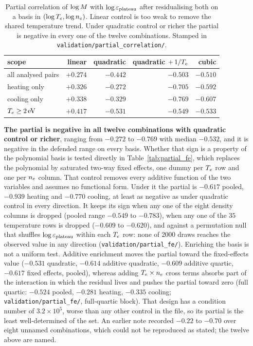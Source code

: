 \begin{table}[htbp]
\centering
\caption{Partial correlation of $\log M$ with $\log\varepsilon_{\mathrm{plateau}}$ after
residualising both on a basis in $(\log T_e,\log n_e)$. Linear control is too
weak to remove the shared temperature trend. Under quadratic control or richer
the partial is negative in every one of the twelve combinations.
Stamped in \texttt{validation/partial\_correlation/}.}
\label{tab:partial_sweep}
\begin{tabular}{lrrrr}
  \toprule
  scope & linear & quadratic & quadratic $+\,1/T_e$ & cubic \\
  \midrule
  all analysed pairs & $+0.274$ & $-0.442$ & $-0.503$ & $-0.510$ \\
  heating only       & $+0.326$ & $-0.272$ & $-0.705$ & $-0.592$ \\
  cooling only       & $+0.338$ & $-0.329$ & $-0.769$ & $-0.607$ \\
  $T_e\ge\SI{2}{\electronvolt}$ & $+0.417$ & $-0.531$ & $-0.549$ & $-0.533$ \\
  \bottomrule
\end{tabular}
\end{table}

\textbf{The partial is negative in all twelve combinations with quadratic
control or richer}, ranging from $-0.272$ to $-0.769$ with median $-0.532$, and
it is negative in the defended range on every basis. Whether that sign is a
property of the polynomial basis is tested directly in
Table~\ref{tab:partial_fe}, which replaces the polynomial by saturated two-way
fixed effects, one dummy per $T_e$ row and one per $n_e$ column. That control
removes every additive function of the two variables and assumes no functional
form. Under it the partial is $-0.617$ pooled, $-0.939$ heating and $-0.770$
cooling, at least as negative as under quadratic control in every direction.
It keeps its sign when any one of the eight density columns is dropped (pooled
range $-0.549$ to $-0.783$), when any one of the $35$ temperature rows is
dropped ($-0.609$ to $-0.620$), and against a permutation null that shuffles
$\log\varepsilon_{\mathrm{plateau}}$ within each $T_e$ row: none of $2000$ draws reaches the observed
value in any direction (\texttt{validation/partial\_fe/}). Enriching the basis
is not a uniform test. Additive enrichment moves the partial toward the
fixed-effects value ($-0.531$ quadratic, $-0.614$ additive quadratic, $-0.609$
additive quartic, $-0.617$ fixed effects, pooled), whereas adding
$T_e\times n_e$ cross terms absorbs part of the interaction in which the
residual lives and pushes the partial toward zero (full quartic: $-0.524$
pooled, $-0.281$ heating, $-0.335$ cooling; \texttt{validation/partial\_fe/},
full-quartic block). That design has a condition number of $3.2\times10^{5}$,
worse than any other control in the file, so its partial is the least
well-determined of the set. An earlier note recorded $-0.22$ to $-0.70$ over
eight unnamed combinations, which could not be reproduced as stated; the twelve
above are named.

